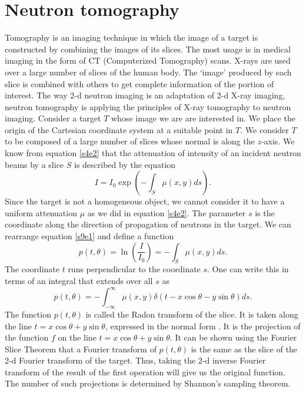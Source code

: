 \documentclass{article}
\numberwithin{equation}{section}
\begin{document}
\section{Neutron tomography}\label{s9}
Tomography is an imaging technique in which the image of a target is constructed
by combining the images of its slices. The most usage is in medical imaging
in the form of CT (Computerized Tomography) scans. X-rays are used over a 
large number of slices of the human body. The `image' produced by each slice
is combined with others to get complete information of the portion of interest.
The way 2-d neutron imaging is an adaptation of 2-d X-ray imaging, neutron
tomography is applying the principles of X-ray tomography to neutron imaging. 
Consider a target $T$ whose image we are are interested in. We place the origin
of the Cartesian coordinate system at a suitable point in $T$. We consider $T$
to be composed of a large number of slices whose normal is along the $z$-axis.
We know from equation \eqref{s4e2} that the attenuation of intensity of an
incident neutron beams by a slice $S$ is described by the equation
\begin{equation}\label{s9e1}
I = I_0\exp\left(-\int_S\mu(x, y)ds\right).
\end{equation}
Since the target is not a homogeneous object, we cannot consider it to have a
uniform attenuation $\mu$ as we did in equation \eqref{s4e2}. The parameter
$s$ is the coordinate along the direction of propagation of neutrons in the
target. We can rearrange equation \eqref{s9e1} and define a function
\begin{equation}\label{s9e2}
p(t, \theta) = \ln\left(\frac{I}{I_0}\right) = -\int_S\mu(x, y)ds.
\end{equation}
The coordinate $t$ runs perpendicular to the coordinate $s$. One can write 
this in terms of an integral that extends over all $s$ as
\begin{equation}\label{s9e3}
p(t, \theta) = 
-\int_{-\infty}^\infty \mu(x, y)\delta(t - x\cos\theta - y\sin\theta)ds.
\end{equation}
The function $p(t, \theta)$ is called the Radon transform of the slice. It is
taken along the line $t = x\cos\theta + y\sin\theta$, expressed in the 
normal form \cite{gonzales1992digital}. It is the projection of the function
$f$ on the line $t = x\cos\theta + y\sin\theta$. It can be shown using the
Fourier Slice Theorem \cite{bracewell1956strip} that a Fourier transform of
$p(t, \theta)$ is the same as the slice of the 2-d Fourier transform of the
target. Thus, taking the 2-d inverse Fourier transform of the result of the
first operation will give us the original function. The number of such
projections is determined by Shannon's sampling theorem. 
\end{document}
